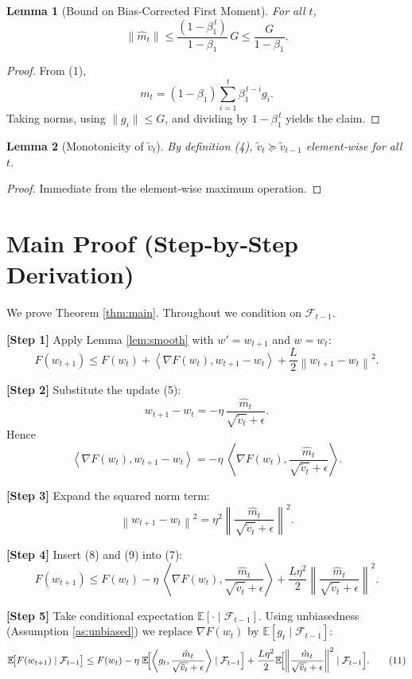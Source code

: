\documentclass{article}
\newtheorem{lemma}{Lemma}
\newcommand{\E}{\mathbb{E}}
\newcommand{\norm}[1]{\left\|#1\right\|}
\newcommand{\ip}[2]{\left\langle #1,#2\right\rangle}
\begin{document}
\begin{lemma}[Bound on Bias‑Corrected First Moment]\label{lem:m_bound}
For all $t$,
\[
\|\hat m_t\| \le \frac{(1-\beta_1^{\,t})}{1-\beta_1}\,G \le \frac{G}{1-\beta_1}.
\]
\end{lemma}
\begin{proof}
From (1),
\[
m_t = (1-\beta_1)\sum_{i=1}^{t}\beta_1^{\,t-i} g_i .
\]
Taking norms, using $\|g_i\|\le G$, and dividing by $1-\beta_1^{\,t}$ yields the claim. \hfill\qedhere
\end{proof}

\begin{lemma}[Monotonicity of $\tilde v_t$]\label{lem:max}
By definition (4), $\tilde v_t \succeq \tilde v_{t-1}$ element‑wise for all $t$.
\end{lemma}
\begin{proof}
Immediate from the element‑wise maximum operation. \hfill\qedhere
\end{proof}

\section*{Main Proof (Step‑by‑Step Derivation)}
We prove Theorem \ref{thm:main}. Throughout we condition on $\mathcal{F}_{t-1}$.

\noindent\textbf{[Step 1]} Apply Lemma \ref{lem:smooth} with $w'=w_{t+1}$ and $w=w_t$:
\begin{equation}
F(w_{t+1})\le F(w_t) + \ip{\nabla F(w_t)}{w_{t+1}-w_t}
+ \frac{L}{2}\norm{w_{t+1}-w_t}^2 . \tag{7}
\end{equation}

\noindent\textbf{[Step 2]} Substitute the update (5):
\[
w_{t+1}-w_t = -\eta\,\frac{\hat m_t}{\sqrt{\tilde v_t}+\epsilon}.
\]
Hence
\[
\ip{\nabla F(w_t)}{w_{t+1}-w_t}
= -\eta\;\ip{\nabla F(w_t)}{\frac{\hat m_t}{\sqrt{\tilde v_t}+\epsilon}} . \tag{8}
\]

\noindent\textbf{[Step 3]} Expand the squared norm term:
\[
\norm{w_{t+1}-w_t}^2
= \eta^2 \norm{\frac{\hat m_t}{\sqrt{\tilde v_t}+\epsilon}}^2 . \tag{9}
\]

\noindent\textbf{[Step 4]} Insert (8) and (9) into (7):
\[
F(w_{t+1})\le F(w_t)
- \eta\;\ip{\nabla F(w_t)}{\frac{\hat m_t}{\sqrt{\tilde v_t}+\epsilon}}
+ \frac{L\eta^2}{2}\norm{\frac{\hat m_t}{\sqrt{\tilde v_t}+\epsilon}}^2 . \tag{10}
\]

\noindent\textbf{[Step 5]} Take conditional expectation $\E[\cdot\mid\mathcal{F}_{t-1}]$.
Using unbiasedness (Assumption \ref{as:unbiased}) we replace $\nabla F(w_t)$ by $\E[g_t\mid\mathcal{F}_{t-1}]$:
\[
\E\!\bigl[F(w_{t+1})\mid\mathcal{F}_{t-1}\bigr]
\le F(w_t)
- \eta\;\E\!\Bigl[\ip{g_t}{\frac{\hat m_t}{\sqrt{\tilde v_t}+\epsilon}}\mid\mathcal{F}_{t-1}\Bigr]
+ \frac{L\eta^2}{2}\E\!\Bigl[\norm{\frac{\hat m_t}{\sqrt{\tilde v_t}+\epsilon}}^2\mid\mathcal{F}_{t-1}\Bigr]. \tag{11}
\]
\end{document}
